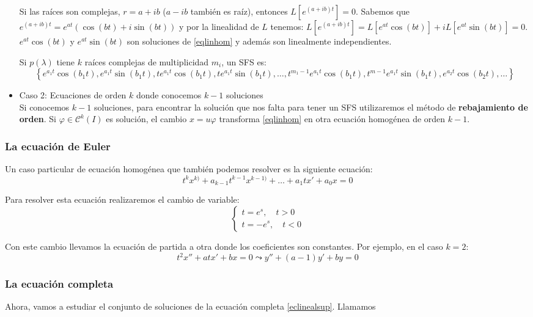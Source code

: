 \begin{itemize}
  Si las raíces son complejas, $r = a+ib$ ($a-ib$ también es raíz),  entonces $L\left[e^{(a+ib)t}\right] = 0$. Sabemos que $e^{(a+ib)t} = e^{at}(\cos(bt)+i\sin(bt))$ y por la linealidad de $L$ tenemos: $L\left[e^{(a+ib)t}\right] = L\left[e^{at}\cos(bt)\right] + iL\left[e^{at}\sin(bt)\right] = 0$. $e^{at}\cos(bt)$ y $e^{at}\sin(bt)$
  son soluciones de \ref{eqlinhom} y además son linealmente independientes.
  \begin{ncor}
    Si $p(\lambda)$ tiene $k$ raíces complejas de multiplicidad $m_i$, un SFS es:
    \[
    \left\{e^{a_1t}\cos(b_1t), e^{a_1t}\sin(b_1t), te^{a_1t}\cos(b_1t), te^{a_1t}\sin(b_1t),\dots,t^{m_1-1}e^{a_1t}\cos(b_1t), t^{m-1}e^{a_1t}\sin(b_1t), e^{a_2t}\cos(b_2t),\dots\right\}
    \]
  \end{ncor}
\item Caso 2: Ecuaciones de orden $k$ donde conocemos $k-1$ soluciones\\
  Si conocemos $k-1$ soluciones, para encontrar la solución que nos falta para tener un SFS utilizaremos el método de \textbf{rebajamiento de orden}. Si $\varphi \in \mathscr{C}^k(I)$ es solución, el cambio $x = u\varphi$ transforma \ref{eqlinhom} en otra ecuación homogénea de orden $k-1$.
\end{itemize}

\subsubsection{La ecuación de Euler}
Un caso particular de ecuación homogénea que también podemos resolver es la siguiente ecuación:
\[
t^kx^{k)}+a_{k-1}t^{k-1}x^{k-1)}+\dots+a_1tx'+a_0x=0
\]

Para resolver esta ecuación realizaremos el cambio de variable:
\[
\begin{cases}
  t=e^s,\quad t>0\\
  t=-e^s,\quad t<0
\end{cases}
\]

Con este cambio llevamos la ecuación de partida a otra donde los coeficientes son constantes. Por ejemplo, en el caso $k=2$:
\[
t^2x''+atx'+bx = 0 \leadsto y''+(a-1)y'+by = 0
\]

\subsubsection{La ecuación completa}

Ahora, vamos a estudiar el conjunto de soluciones de la ecuación completa \eqref{eclinealsup}.
Llamamos

